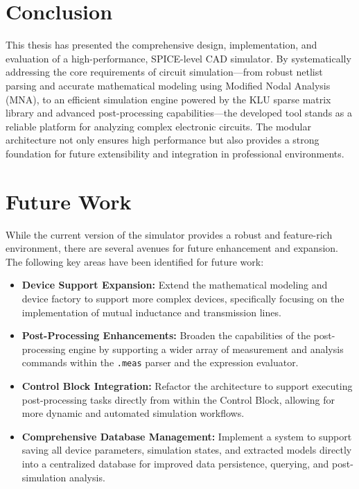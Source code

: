 \setlength{\parskip}{\baselineskip}

\section{Conclusion}
This thesis has presented the comprehensive design, implementation, and evaluation of a high-performance, SPICE-level CAD simulator. By systematically addressing the core requirements of circuit simulation—from robust netlist parsing and accurate mathematical modeling using Modified Nodal Analysis (MNA), to an efficient simulation engine powered by the KLU sparse matrix library and advanced post-processing capabilities—the developed tool stands as a reliable platform for analyzing complex electronic circuits. The modular architecture not only ensures high performance but also provides a strong foundation for future extensibility and integration in professional environments.

\section{Future Work}
While the current version of the simulator provides a robust and feature-rich environment, there are several avenues for future enhancement and expansion. The following key areas have been identified for future work:

\begin{itemize}
    \item \textbf{Device Support Expansion:} Extend the mathematical modeling and device factory to support more complex devices, specifically focusing on the implementation of mutual inductance and transmission lines.
    \item \textbf{Post-Processing Enhancements:} Broaden the capabilities of the post-processing engine by supporting a wider array of measurement and analysis commands within the \texttt{.meas} parser and the expression evaluator.
    \item \textbf{Control Block Integration:} Refactor the architecture to support executing post-processing tasks directly from within the Control Block, allowing for more dynamic and automated simulation workflows.
    \item \textbf{Comprehensive Database Management:} Implement a system to support saving all device parameters, simulation states, and extracted models directly into a centralized database for improved data persistence, querying, and post-simulation analysis.
\end{itemize}

